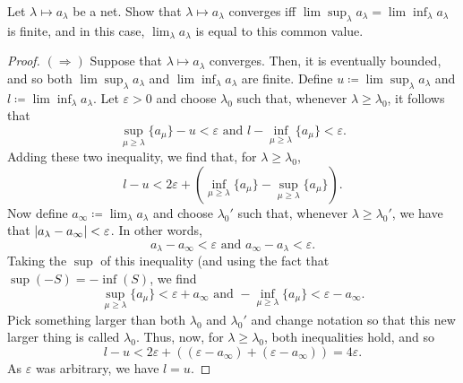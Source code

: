\begin{prp}\label{prp3.3.52}
Let $\lambda \mapsto a_\lambda$ be a net.  Show that $\lambda \mapsto a_\lambda$ converges iff $\lim \sup _\lambda a_\lambda =\lim \inf _\lambda a_\lambda$  is finite, and in this case, $\lim _\lambda a_\lambda$ is equal to this common value.
\begin{proof}
$(\Rightarrow )$ Suppose that $\lambda \mapsto a_\lambda$ converges.  Then, it is eventually bounded, and so both $\lim \sup _\lambda a_\lambda$ and $\lim \inf _\lambda a_\lambda$ are finite.  Define $u\coloneqq \lim \sup _\lambda a_\lambda$ and $l\coloneqq \lim \inf _\lambda a_\lambda$.  Let $\varepsilon >0$ and choose $\lambda _0$ such that, whenever $\lambda \geq \lambda _0$, it follows that
\begin{equation}
\sup _{\mu \geq \lambda}\{ a_\mu \} -u<\varepsilon \text{ and }l-\inf _{\mu \geq \lambda}\{ a_\mu \} <\varepsilon .
\end{equation}
Adding these two inequality, we find that, for $\lambda \geq \lambda _0$,
\begin{equation}
l-u<2\varepsilon +\left( \inf _{\mu\geq \lambda}\{ a_\mu \} -\sup _{\mu \geq \lambda}\{ a_\mu \}\right) .
\end{equation}
Now define $a_\infty \coloneqq \lim _\lambda a_\lambda$ and choose $\lambda _0'$ such that, whenever $\lambda \geq \lambda _0'$, we have that $\lvert a_\lambda -a_\infty\rvert<\varepsilon$.  In other words,
\begin{equation}
a_\lambda -a_\infty <\varepsilon \text{ and }a_\infty -a_\lambda <\varepsilon .
\end{equation}
Taking the $\sup$ of this inequality (and using the fact that $\sup (-S)=-\inf (S)$, we find
\begin{equation}
\sup _{\mu \geq \lambda}\{ a_\mu \} <\varepsilon +a_\infty \text{ and }-\inf _{\mu \geq \lambda}\{ a_\mu \} <\varepsilon -a_\infty .
\end{equation}
Pick something larger than both $\lambda _0$ and $\lambda _0'$ and change notation so that this new larger thing is called $\lambda _0$.  Thus, now, for $\lambda \geq \lambda _0$, both inequalities hold, and so
\begin{equation}
l-u<2\varepsilon +\left( (\varepsilon -a_\infty) +(\varepsilon -a_\infty )\right) =4\varepsilon .
\end{equation}
As $\varepsilon$ was arbitrary, we have $l=u$.


\end{proof}
\end{prp}
